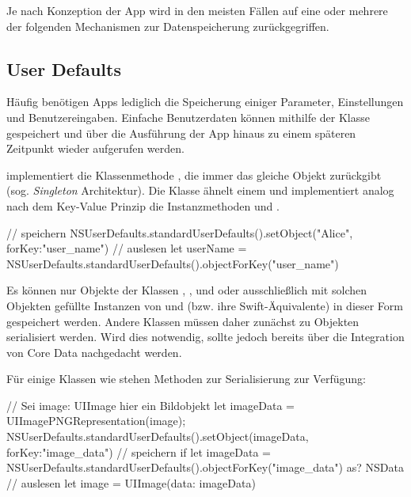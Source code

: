 \documentclass[parskip=half, final]{scrreprt}
\begin{document}
Je nach Konzeption der App wird in den meisten Fällen auf eine oder mehrere der folgenden Mechanismen zur Datenspeicherung zurückgegriffen.

\subsection{User Defaults}\label{sec:userdefaults}

Häufig benötigen Apps lediglich die Speicherung einiger Parameter, Einstellungen und Benutzereingaben. Einfache Benutzerdaten können mithilfe der  Klasse gespeichert und über die Ausführung der App hinaus zu einem späteren Zeitpunkt wieder aufgerufen werden.

 implementiert die Klassenmethode , die immer das gleiche Objekt zurückgibt (sog. \emph{Singleton} Architektur). Die Klasse ähnelt einem  und implementiert analog nach dem Key-Value Prinzip die Instanzmethoden  und .

\begin{swiftcode}
// speichern
NSUserDefaults.standardUserDefaults().setObject("Alice", forKey:"user_name")
// auslesen
let userName = NSUserDefaults.standardUserDefaults().objectForKey("user_name")
\end{swiftcode}

Es können nur Objekte der Klassen , ,  und  oder ausschließlich mit solchen Objekten gefüllte Instanzen von  und  (bzw. ihre Swift-Äquivalente) in dieser Form gespeichert werden. Andere Klassen müssen daher zunächst zu  Objekten serialisiert werden. Wird dies notwendig, sollte jedoch bereits über die Integration von Core Data  nachgedacht werden.

Für einige Klassen wie  stehen Methoden zur Serialisierung zur Verfügung:

\begin{swiftcode}
// Sei image: UIImage hier ein Bildobjekt
let imageData = UIImagePNGRepresentation(image);
NSUserDefaults.standardUserDefaults().setObject(imageData, forKey:"image_data") // speichern
if let imageData = NSUserDefaults.standardUserDefaults().objectForKey("image_data") as? NSData { // auslesen
    let image = UIImage(data: imageData)
}
\end{swiftcode}
\end{document}
